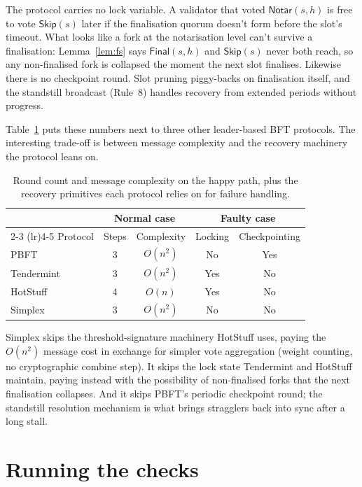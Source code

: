 \documentclass[11pt,a4paper]{article}
\newcommand{\Notar}{\mathsf{Notar}}
\newcommand{\Skip}{\mathsf{Skip}}
\newcommand{\Final}{\mathsf{Final}}
\begin{document}
The protocol carries no lock variable. A validator that voted
$\Notar(s,h)$ is free to vote $\Skip(s)$ later if the finalisation
quorum doesn't form before the slot's timeout. What looks like a
fork at the notarisation level can't survive a finalisation:
Lemma~\ref{lem:fs} says $\Final(s,h)$ and $\Skip(s)$ never both
reach, so any non-finalised fork is collapsed the moment the next
slot finalises. Likewise there is no checkpoint round. Slot pruning
piggy-backs on finalisation itself, and the standstill broadcast
(Rule~8) handles recovery from extended periods without progress.

Table~\ref{tab:complexity} puts these numbers next to three other
leader-based BFT protocols. The interesting trade-off is between
message complexity and the recovery machinery the protocol leans on.

\begin{table}[h]
\centering
\begin{tabular}{lcccc}
\toprule
            & \multicolumn{2}{c}{Normal case} & \multicolumn{2}{c}{Faulty case} \\
\cmidrule(lr){2-3} \cmidrule(lr){4-5}
Protocol    & Steps & Complexity     & Locking & Checkpointing \\
\midrule
PBFT        & 3     & $O(n^2)$       & No      & Yes \\
Tendermint  & 3     & $O(n^2)$       & Yes     & No  \\
HotStuff    & 4     & $O(n)$         & Yes     & No  \\
Simplex     & 3     & $O(n^2)$       & No      & No  \\
\bottomrule
\end{tabular}
\caption{Round count and message complexity on the happy path,
plus the recovery primitives each protocol relies on for failure
handling.}
\label{tab:complexity}
\end{table}

Simplex skips the threshold-signature machinery HotStuff uses, paying
the $O(n^2)$ message cost in exchange for simpler vote aggregation
(weight counting, no cryptographic combine step). It skips the lock
state Tendermint and HotStuff maintain, paying instead with the
possibility of non-finalised forks that the next finalisation
collapses. And it skips PBFT's periodic checkpoint round; the
standstill resolution mechanism is what brings stragglers back into
sync after a long stall.

\section{Running the checks}
\end{document}
